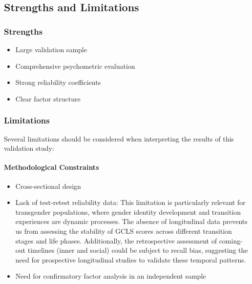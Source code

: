 \documentclass[12pt,a4paper]{article}
\begin{document}
\subsection{Strengths and Limitations}

\subsubsection{Strengths}
\begin{itemize}
\item Large validation sample
\item Comprehensive psychometric evaluation
\item Strong reliability coefficients
\item Clear factor structure
\end{itemize}

\subsubsection{Limitations}

Several limitations should be considered when interpreting the results of this validation study:

\paragraph{Methodological Constraints}
\begin{itemize}
\item Cross-sectional design
\item Lack of test-retest reliability data: This limitation is particularly relevant for transgender populations, where gender identity development and transition experiences are dynamic processes. The absence of longitudinal data prevents us from assessing the stability of GCLS scores across different transition stages and life phases. Additionally, the retrospective assessment of coming-out timelines (inner and social) could be subject to recall bias, suggesting the need for prospective longitudinal studies to validate these temporal patterns.
\item Need for confirmatory factor analysis in an independent sample
\end{itemize}
\end{document}
